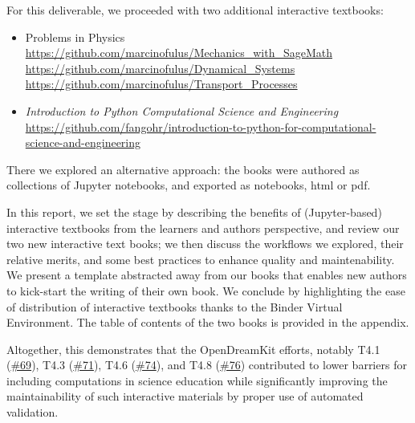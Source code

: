 For this deliverable, we proceeded with two additional interactive
textbooks:

\begin{itemize}
\tightlist
\item
  Problems in Physics
  \url{https://github.com/marcinofulus/Mechanics_with_SageMath}
  \url{https://github.com/marcinofulus/Dynamical_Systems}
  \url{https://github.com/marcinofulus/Transport_Processes}
\item
  \emph{Introduction to Python Computational Science and Engineering}
  \url{https://github.com/fangohr/introduction-to-python-for-computational-science-and-engineering}
\end{itemize}

There we explored an alternative approach: the books were authored as
collections of Jupyter notebooks, and exported as notebooks, html or
pdf.

In this report, we set the stage by describing the benefits of
(Jupyter-based) interactive textbooks from the learners and authors
perspective, and review our two new interactive text books; we then
discuss the workflows we explored, their relative merits, and some best
practices to enhance quality and maintenability. We present a template
abstracted away from our books that enables new authors to kick-start
the writing of their own book. We conclude by highlighting the ease of
distribution of interactive textbooks thanks to the Binder Virtual
Environment. The table of contents of the two books is provided in the
appendix.

Altogether, this demonstrates that the OpenDreamKit efforts, notably
T4.1
(\href{https://github.com/OpenDreamKit/OpenDreamKit/issues/69}{\#69}),
T4.3
(\href{https://github.com/OpenDreamKit/OpenDreamKit/issues/71}{\#71}),
T4.6
(\href{https://github.com/OpenDreamKit/OpenDreamKit/issues/74}{\#74}),
and T4.8
(\href{https://github.com/OpenDreamKit/OpenDreamKit/issues/76}{\#76})
contributed to lower barriers for including computations in science
education while significantly improving the maintainability of such
interactive materials by proper use of automated validation.
